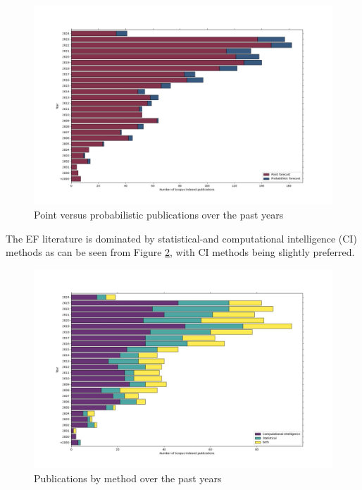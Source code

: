\begin{figure}
  \includegraphics[width=\textwidth]{images/point_vs_prob.jpg}
  \caption{Point versus probabilistic publications over the past years}
  \label{fig:point_vs_prob}
\end{figure}

The EF literature is dominated by statistical-and computational intelligence (CI) methods as can be seen from Figure \ref{fig:cs_stat_both}, with CI methods being slightly preferred. 
\begin{figure}
  \includegraphics[width=\textwidth]{images/cs_stat_both.jpg}
  \caption{Publications by method over the past years}
  \label{fig:cs_stat_both}
\end{figure}

